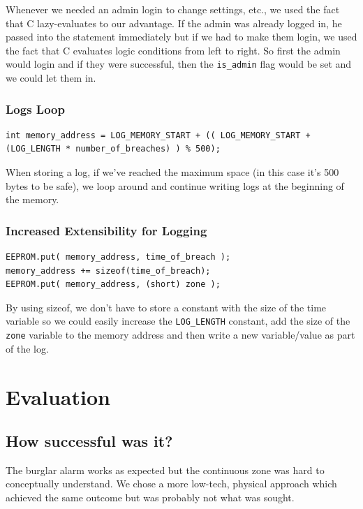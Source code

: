 \documentclass[a4paper,11pt]{article}
\theoremstyle{mytheor}
\newcommand{\inlinecode}[1]{\colorbox{inlinebackground}{\lstinline[basicstyle=\ttfamily\color{black}]|#1|}}
\begin{document}
Whenever we needed an admin login to change settings, etc., we used the fact that C lazy-evaluates to our advantage. If the admin was already logged in, he passed into the statement immediately but if we had to make them login, we used the fact that C evaluates logic conditions from left to right. So first the admin would login and if they were successful, then the \inlinecode{is_admin} flag would be set and we could let them in.

\subsubsection{Logs Loop}

\begin{lstlisting}
int memory_address = LOG_MEMORY_START + (( LOG_MEMORY_START + (LOG_LENGTH * number_of_breaches) ) % 500);
\end{lstlisting}

When storing a log, if we've reached the maximum space (in this case it's 500 bytes to be safe), we loop around and continue writing logs at the beginning of the memory.

\subsubsection{Increased Extensibility for Logging}
\begin{lstlisting}
EEPROM.put( memory_address, time_of_breach );
memory_address += sizeof(time_of_breach);
EEPROM.put( memory_address, (short) zone );
\end{lstlisting}

By using sizeof, we don't have to store a constant with the size of the time variable so we could easily increase the \inlinecode{LOG_LENGTH} constant, add the size of the \inlinecode{zone} variable to the memory address and then write a new variable/value as part of the log.


\section{Evaluation}
\subsection{How successful was it?}
The burglar alarm works as expected but the continuous zone was hard to conceptually understand. We chose a more low-tech, physical approach which achieved the same outcome but was probably not what was sought.
\end{document}
